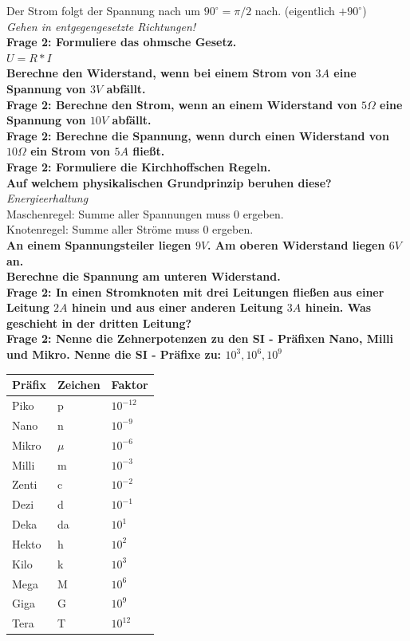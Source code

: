 \documentclass[11pt,a4paper]{scrartcl}
\begin{document}
Der Strom folgt der Spannung nach um $90^\circ=\pi/2$ nach. (eigentlich $+90^\circ$)\\
\textit{Gehen in entgegengesetzte Richtungen!}\\
\textbf{Frage 2: Formuliere das ohmsche Gesetz.}\\
$U=R*I$\\
\textbf{Berechne den Widerstand, wenn bei einem Strom von $3A$ eine Spannung von $3V$ abfällt.}\\
\textbf{Frage 2: Berechne den Strom, wenn an einem Widerstand von $5\Omega$ eine Spannung von $10V$ abfällt.}\\
\textbf{Frage 2: Berechne die Spannung, wenn durch einen Widerstand von $10\Omega$ ein Strom von $5A$ fließt. }\\
\textbf{Frage 2: Formuliere die Kirchhoffschen Regeln.}\\
\textbf{Auf welchem physikalischen Grundprinzip beruhen diese?}\\
\textit{Energieerhaltung}\\
Maschenregel: Summe aller Spannungen muss 0 ergeben.\\
Knotenregel: Summe aller Ströme muss 0 ergeben.\\
\textbf{An einem Spannungsteiler liegen $9V$. Am oberen Widerstand liegen $6V$ an.}\\
\textbf{Berechne die Spannung am unteren Widerstand.}\\
\textbf{Frage 2: In einen Stromknoten mit drei Leitungen fließen aus einer Leitung $2A$ hinein und aus einer anderen Leitung $3A$ hinein. Was geschieht in der dritten Leitung?}\\
\textbf{Frage 2: Nenne die Zehnerpotenzen zu den SI - Präfixen Nano, Milli und Mikro. Nenne die SI - Präfixe zu: $10^3, 10^6, 10^9$}\\
\begin{tabular}{|l|l|l|}
\hline
\textbf{Präfix} & \textbf{Zeichen} & \textbf{Faktor}\\
\hline\hline
Piko   & p  & $10^{-12}$\\
\hline
Nano   & n  & $10^{-9}$\\
\hline
Mikro  & $\mu$ & $10^{-6}$\\
\hline
Milli  & m  & $10^{-3}$\\
\hline
Zenti  & c  & $10^{-2}$\\
\hline
Dezi   & d  & $10^{-1}$\\
\hline\hline
Deka   & da & $10^{1}$\\
\hline
Hekto  & h  & $10^{2}$\\
\hline
Kilo   & k  & $10^{3}$\\
\hline
Mega   & M  & $10^{6}$\\
\hline
Giga   & G  & $10^{9}$\\
\hline
Tera   & T  & $10^{12}$\\
\hline
\end{tabular}\\
\end{document}
